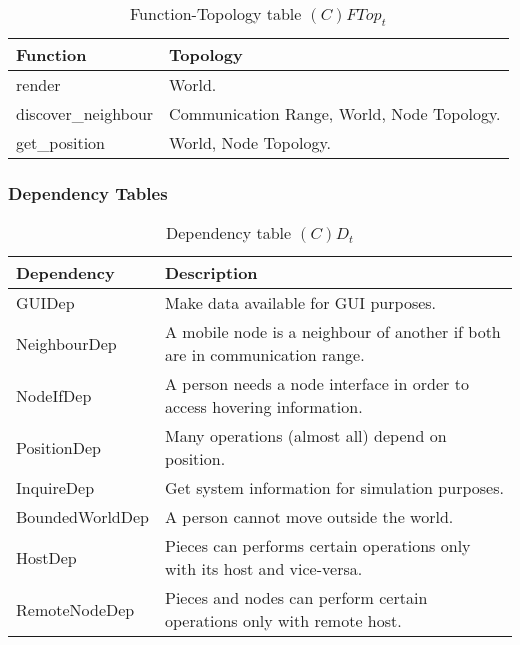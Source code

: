 \begin{table}[H]
	\centering
	\begin{tabular}{|p{4cm}|p{8cm}|}
			\hline
			\textbf{Function} & \textbf{Topology} \\
			\hline
			render & World.\\
			\hline
			discover\_neighbour & Communication Range, World, Node Topology. \\
			\hline
			get\_position & World, Node Topology. \\
			\hline
		\end{tabular}
	\caption{Function-Topology table $(C)FTop_t$}
	\label{tab:cftopt}
\end{table}


\subsubsection{Dependency Tables}

\begin{table}[H]
	\centering
	\begin{tabular}{|p{4cm}|p{8cm}|}
			\hline
			\textbf{Dependency} & \textbf{Description} \\
			\hline
			GUIDep & Make data available for GUI purposes. \\
			\hline
			NeighbourDep & A mobile node is a neighbour of another if both are in
			communication range. \\
			\hline
      NodeIfDep & A person needs a node interface in order to access hovering
      information. \\
			\hline
      PositionDep & Many operations (almost all) depend on position. \\
			\hline
			InquireDep & Get system information for simulation purposes. \\
			\hline
			BoundedWorldDep & A person cannot move outside the world. \\
			\hline
			HostDep & Pieces can performs certain operations only with its host and vice-versa. \\
			\hline
			RemoteNodeDep & Pieces and nodes can perform certain operations only with remote host. \\
			\hline
		\end{tabular}
	\caption{Dependency table $(C)D_t$}
	\label{tab:cdt}
\end{table}

